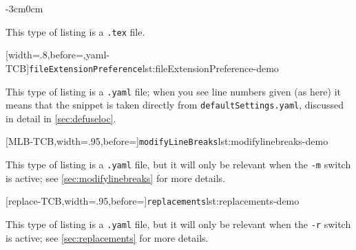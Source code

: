 \documentclass[10pt]{article}
\newenvironment{widepage}{\begin{adjustwidth}{-3cm}{0cm}}{\end{adjustwidth}}
\begin{document}
 \begin{widepage}
  \begin{minipage}{.4\linewidth}
  \end{minipage}%
  \hfill
  \begin{minipage}{.4\linewidth}
   This type of listing is a \texttt{.tex} file.
  \end{minipage}%

  \begin{minipage}{.4\linewidth}
   [width=.8\linewidth,before=\centering,yaml-TCB]{\texttt{fileExtensionPreference}}{lst:fileExtensionPreference-demo}
  \end{minipage}%
  \hfill
  \begin{minipage}{.4\linewidth}
   This type of listing is a \texttt{.yaml} file; when you see line numbers given (as here)
   it means that the snippet is taken directly from \texttt{defaultSettings.yaml}, discussed in
   detail in \vref{sec:defuseloc}.
  \end{minipage}%

  \begin{minipage}{.6\linewidth}
   [MLB-TCB,width=.95\linewidth,before=\centering]{\texttt{modifyLineBreaks}}{lst:modifylinebreaks-demo}
  \end{minipage}%
  \hfill
  \begin{minipage}{.4\linewidth}
   This type of listing is a \texttt{.yaml} file, but it will only
   be relevant when the \texttt{-m} switch is active; see \vref{sec:modifylinebreaks}
   for more details.
  \end{minipage}%

  \begin{minipage}{.6\linewidth}
   [replace-TCB,width=.95\linewidth,before=\centering]{\texttt{replacements}}{lst:replacements-demo}
  \end{minipage}%
  \hfill
  \begin{minipage}{.4\linewidth}
   This type of listing is a \texttt{.yaml} file, but it will only
   be relevant when the \texttt{-r} switch is active; see \vref{sec:replacements}
   for more details.
  \end{minipage}%
 \end{widepage}
\end{document}
